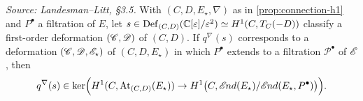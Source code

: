 \begin{lemma}
  \label{lem:parabolic-extension-obstruction}
  \textit{Source: Landesman--Litt, \S3.5.}
  With $(C,D,E_\star,\nabla)$ as in \cref{prop:connection-h1} and $P^\bullet$ a
  filtration of $E$, let $s \in \operatorname{Def}_{(C,D)}(\mathbb{C}[\varepsilon]/\varepsilon^2)
  \simeq H^1(C,T_C(-D))$ classify a first-order deformation $(\mathscr{C},\mathscr{D})$
  of $(C,D)$. If $q^\nabla(s)$ corresponds to a deformation
  $(\mathscr{C},\mathscr{D},\mathscr{E}_\star)$ of $(C,D,E_\star)$ in which $P^\bullet$
  extends to a filtration $\mathscr{P}^\bullet$ of $\mathscr{E}$, then
  \[
    q^\nabla(s) \in \ker\Bigl(H^1(C,\operatorname{At}_{(C,D)}(E_\star)) \to
    H^1\bigl(C,\mathscr{E}\kern -1pt nd(E_\star)/\mathscr{E}\kern -1pt nd(E_\star,P^\bullet)\bigr)\Bigr).
  \]
\end{lemma}
